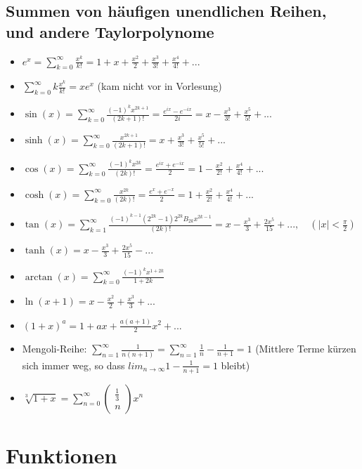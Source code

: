 \documentclass[a3paper, 11pt, landscape]{scrartcl}
\begin{document}
\begin{multicols*}{3}
		\subsection{Summen von häufigen unendlichen Reihen, und andere Taylorpolynome}
		\begin{itemize}
			\item $e^x=\sum_{k=0}^\infty \frac{x^k}{k!} = 1+x+\frac{x^2}{2}+\frac{x^3}{3!}+\frac{x^4}{4!}+...$
			\item $\sum_{k=0}^\infty k\frac{x^k}{k!} = x e^x$ (kam nicht vor in Vorlesung)
			\item $\sin (x) =\sum_{k=0}^\infty \frac{(-1)^k x^{2k+1}}{(2k+1)!} = \frac{e^{ix}-e^{-ix}}{2i} = x -\frac{x^3}{3!}+\frac{x^5}{5!}+...$
			\item $\sinh(x)=\sum_{k=0}^\infty \frac{x^{2k+1}}{(2k+1)!}=x+\frac{x^3}{3!}+\frac{x^5}{5!}+...$
			\item $\cos (x)=\sum_{k=0}^\infty \frac{(-1)^k x^{2k}}{(2k)!} = \frac{e^{ix}+e^{-ix}}{2}= 1 - \frac{x^2}{2!}+\frac{x^4}{4!}+...$
			\item $\cosh (x)=\sum_{k=0}^\infty \frac{x^{2k}}{(2k)!} = \frac{e^{x}+e^{-x}}{2} = 1 + \frac{x^2}{2!}+\frac{x^4}{4!}+...$
			\item $\tan(x)=\sum_{k=1}^\infty \frac{(-1)^{k-1}(2^{2k}-1)2^{2k}B_{2k}x^{2k-1}}{(2k)!}=x-\frac{x^3}{3}+\frac{2x^5}{15}+... ,\quad (|x|<\frac{\pi}{2})$
			\item $ \tanh (x) = x-\frac{x^3}{3}+\frac{2x^5}{15}-...$
			\item $\arctan (x)= \sum_{k=0}^{\infty} \frac{(-1)^{k} x^{1+2 k}}{1+2 k}$
			\item $\ln(x+1) = x -\frac{x^2}{2}+\frac{x^3}{3}+...$
			\item $(1+x)^a=1+ax+\frac{a(a+1)}{2}x^2+...$
			\item Mengoli-Reihe: $\sum_{n=1}^\infty \frac{1}{n(n+1)}=\sum_{n=1}^\infty \frac{1}{n}-\frac{1}{n+1} = 1$ (Mittlere Terme kürzen sich immer weg, so dass $lim_{n\to\infty} 1 - \frac{1}{n+1}=1$ bleibt)
			\item $\sqrt[3]{1+x}=\sum_{n=0}^{\infty}\left(\begin{array}{l}\frac{1}{3} \\n\end{array}\right) x^{n}$
		\end{itemize}
		
	\section{Funktionen}

\end{multicols*}
\end{document}
